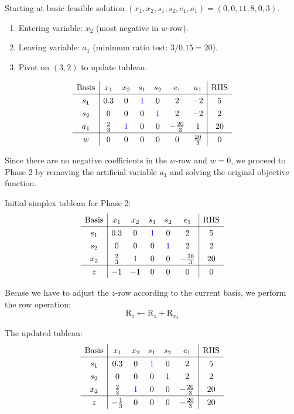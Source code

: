 \documentclass[a4paper, 10pt]{article}
\begin{document}
\begin{tosubmit}
Starting at basic feasible solution \( (x_1, x_2, s_1, s_2, e_1, a_1) = (0, 0, 11, 8, 0, 3) \).
\begin{enumerate}
    \item Entering variable: \( x_2 \) (most negative in \( w \)-row).
    \item Leaving variable: \( a_1 \) (minimum ratio test: \( 3/0.15 = 20 \)).
    \item Pivot on \( (3,2) \) to update tableau.
\end{enumerate}
\[
\renewcommand{\arraystretch}{1.3}
\begin{array}{c|cccccc|c}
    \text{Basis} & x_1 & x_2 & s_1 & s_2 & e_1 & a_1 & \text{RHS} \\
    \hline
    s_1 & 0.3 & 0 & \textcolor[HTML]{0000FF}{1} & 0 & 2 & -2 & 5 \\
    s_2 & 0 & 0 & 0 & \textcolor[HTML]{0000FF}{1} & 2 & -2 & 2 \\
    a_1 & \frac{2}{3} & \textcolor[HTML]{0000FF}{1} & 0 & 0 & -\frac{20}{3} & 1 & 20 \\
    \hline
    w & 0 & 0 & 0 & 0 & 0 & \frac{20}{3} & 0 \\
\end{array}
\]

Since there are no negative coefficients in the \( w \)-row and \( w = 0 \), we proceed to Phase 2 by removing the artificial variable \( a_1 \) and solving the original objective function.

\vspace{3mm}

Initial simplex tableau for Phase 2:
\[
\renewcommand{\arraystretch}{1.3}
\begin{array}{c|ccccc|c}
    \text{Basis} & x_1 & x_2 & s_1 & s_2 & e_1 & \text{RHS} \\
    \hline
    s_1 & 0.3 & 0 & \textcolor[HTML]{0000FF}{1} & 0 & 2 & 5 \\
    s_2 & 0 & 0 & 0 & \textcolor[HTML]{0000FF}{1} & 2 & 2 \\
    x_2 & \frac{2}{3} & \textcolor[HTML]{0000FF}{1} & 0 & 0 & -\frac{20}{3} & 20 \\
    \hline
    z & -1 & -1 & 0 & 0 & 0 & 0 \\
\end{array}
\]

Becase we have to adjust the \( z \)-row according to the current basis, we perform the row operation:
\[ \text{R}_z \leftarrow \text{R}_z + \text{R}_{x_2} \]

The updated tableau:
\[
\renewcommand{\arraystretch}{1.3}
\begin{array}{c|ccccc|c}
    \text{Basis} & x_1 & x_2 & s_1 & s_2 & e_1 & \text{RHS} \\
    \hline
    s_1 & 0.3 & 0 & \textcolor[HTML]{0000FF}{1} & 0 & 2 & 5 \\
    s_2 & 0 & 0 & 0 & \textcolor[HTML]{0000FF}{1} & 2 & 2 \\
    x_2 & \frac{2}{3} & \textcolor[HTML]{0000FF}{1} & 0 & 0 & -\frac{20}{3} & 20 \\
    \hline
    z & -\frac{1}{3} & 0 & 0 & 0 & -\frac{20}{3} & 20 \\
\end{array}
\]


\end{tosubmit}
\end{document}

